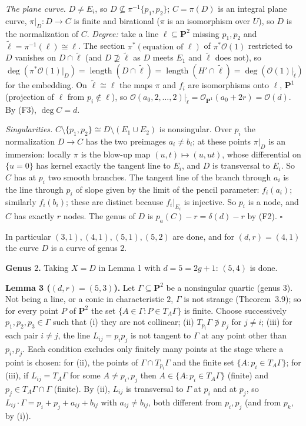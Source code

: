 \documentclass[11pt]{article}
\begin{document}
\emph{The plane curve.} $D\ne E_i$, so $D\not\subseteq\pi^{-1}\{p_1,p_2\}$; $C=\pi(D)$ is an integral plane curve, $\pi|_D:D\to C$ is finite and birational ($\pi$ is an isomorphism over $U$), so $D$ is the normalization of $C$. \emph{Degree:} take a line $\ell\subseteq\mathbf P^2$ missing $p_1,p_2$ and $\tilde\ell=\pi^{-1}(\ell)\cong\ell$. The section $\pi^*(\text{equation of }\ell)$ of $\pi^*\mathcal O(1)$ restricted to $D$ vanishes on $D\cap\tilde\ell$ (and $D\not\supseteq\tilde\ell$ as $D$ meets $E_1$ and $\tilde\ell$ does not), so $\deg(\pi^*\mathcal O(1)|_D)=\operatorname{length}(D\cap\tilde\ell)=\operatorname{length}(H'\cap\tilde\ell)=\deg(\mathcal O(1)|_{\tilde\ell})$ for the embedding. On $\tilde\ell\cong\ell$ the maps $\pi$ and $f_i$ are isomorphisms onto $\ell$, $\mathbf P^1$ (projection of $\ell$ from $p_i\notin\ell$), so $\mathcal O(a_0,2,\dots,2)|_{\tilde\ell}=\mathcal O_{\mathbf P^1}(a_0+2r)=\mathcal O(d)$. By (F3), $\deg C=d$.

\emph{Singularities.} $C\setminus\{p_1,p_2\}\cong D\setminus(E_1\cup E_2)$ is nonsingular. Over $p_i$ the normalization $D\to C$ has the two preimages $a_i\ne b_i$; at these points $\pi|_D$ is an immersion: locally $\pi$ is the blow-up map $(u,t)\mapsto(u,ut)$, whose differential on $\{u=0\}$ has kernel exactly the tangent line to $E_i$, and $D$ is transversal to $E_i$. So $C$ has at $p_i$ two smooth branches. The tangent line of the branch through $a_i$ is the line through $p_i$ of slope given by the limit of the pencil parameter: $f_i(a_i)$; similarly $f_i(b_i)$; these are distinct because $f_i|_{E_i}$ is injective. So $p_i$ is a node, and $C$ has exactly $r$ nodes. The genus of $D$ is $p_a(C)-r=\delta(d)-r$ by (F2). \hfill$\square$

In particular $(3,1),(4,1),(5,1),(5,2)$ are done, and for $(d,r)=(4,1)$ the curve $D$ is a curve of genus $2$.

\textbf{Genus $2$.} Taking $X=D$ in Lemma 1 with $d=5=2g+1$: $(5,4)$ is done.

\textbf{Lemma 3 ($(d,r)=(5,3)$).} Let $\Gamma\subseteq\mathbf P^2$ be a nonsingular quartic (genus $3$). Not being a line, or a conic in characteristic $2$, $\Gamma$ is not strange (Theorem~3.9); so for every point $P$ of $\mathbf P^2$ the set $\{A\in\Gamma:P\in T_A\Gamma\}$ is finite. Choose successively $p_1,p_2,p_3\in\Gamma$ such that (i) they are not collinear; (ii) $T_{p_i}\Gamma\not\ni p_j$ for $j\ne i$; (iii) for each pair $i\ne j$, the line $L_{ij}=p_ip_j$ is not tangent to $\Gamma$ at any point other than $p_i,p_j$. Each condition excludes only finitely many points at the stage where a point is chosen: for (ii), the points of $\Gamma\cap T_{p_i}\Gamma$ and the finite set $\{A:p_i\in T_A\Gamma\}$; for (iii), if $L_{ij}=T_A\Gamma$ for some $A\ne p_i,p_j$ then $A\in\{A:p_i\in T_A\Gamma\}$ (finite) and $p_j\in T_A\Gamma\cap\Gamma$ (finite). By (ii), $L_{ij}$ is transversal to $\Gamma$ at $p_i$ and at $p_j$, so $L_{ij}\cdot\Gamma=p_i+p_j+a_{ij}+b_{ij}$ with $a_{ij}\ne b_{ij}$, both different from $p_i,p_j$ (and from $p_k$, by (i)).
\end{document}
